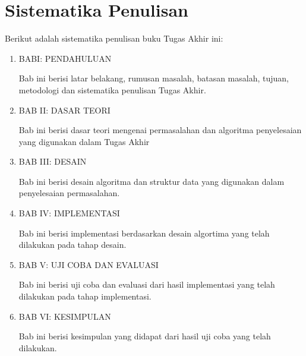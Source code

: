 	\section{Sistematika Penulisan}
	Berikut adalah sistematika penulisan buku Tugas Akhir ini:
	\begin{enumerate}
		\item BABI: PENDAHULUAN
		
		Bab ini berisi latar belakang, rumusan masalah, batasan masalah, tujuan, metodologi dan sistematika penulisan Tugas Akhir.
		
		\item BAB II: DASAR TEORI
		
		Bab ini berisi dasar teori mengenai permasalahan dan algoritma penyelesaian yang digunakan dalam Tugas Akhir
		
		\item BAB III: DESAIN
		
		Bab ini berisi desain algoritma dan struktur data yang digunakan dalam penyelesaian permasalahan.
		
		\item BAB IV: IMPLEMENTASI
		
		Bab ini berisi implementasi berdasarkan desain algortima yang telah dilakukan pada tahap desain.
		
		\item BAB V: UJI COBA DAN EVALUASI
		
		Bab ini berisi uji coba dan evaluasi dari hasil implementasi yang telah dilakukan pada tahap implementasi.
		
		\item BAB VI: KESIMPULAN
		
		Bab ini berisi kesimpulan yang didapat dari hasil uji coba yang telah dilakukan.
	\end{enumerate}

\cleardoublepage
